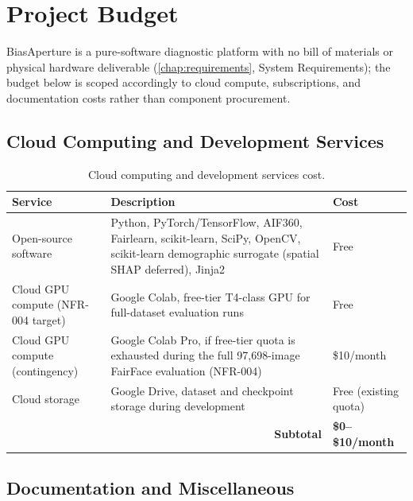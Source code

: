 \chapter{Project Budget}%
\label{app:budget}

BiasAperture is a pure-software diagnostic platform with no bill of materials or physical hardware deliverable (\cref{chap:requirements}, System Requirements); the budget below is scoped accordingly to cloud compute, subscriptions, and documentation costs rather than component procurement.

\section{Cloud Computing and Development Services}

\begin{table}[H]
    \centering
    \small
    \renewcommand{\arraystretch}{1.3}
    \caption{Cloud computing and development services cost.}%
    \label{tab:budget-cloud}
    \begin{tabular}{p{3.5cm}p{6.3cm}p{2.5cm}}
        \toprule
        \textbf{Service} & \textbf{Description} & \textbf{Cost} \\
        \midrule
        Open-source software & Python, PyTorch/TensorFlow, AIF360, Fairlearn, scikit-learn, SciPy, OpenCV, scikit-learn demographic surrogate (spatial SHAP deferred), Jinja2 & Free \\
        Cloud GPU compute (NFR-004 target) & Google Colab, free-tier T4-class GPU for full-dataset evaluation runs & Free \\
        Cloud GPU compute (contingency) & Google Colab Pro, if free-tier quota is exhausted during the full 97{,}698-image FairFace evaluation (NFR-004) & \$10/month \\
        Cloud storage & Google Drive, dataset and checkpoint storage during development & Free (existing quota) \\
        \midrule
        \multicolumn{2}{r}{\textbf{Subtotal}} & \textbf{\$0--\$10/month} \\
        \bottomrule
    \end{tabular}
\end{table}

\section{Documentation and Miscellaneous}


